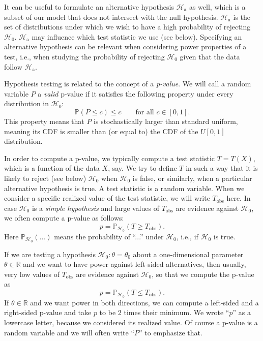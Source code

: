 \documentclass[11pt]{article}
\theoremstyle{plain}
\theoremstyle{definition}
\newcommand{\reals}{\mathbb{R}}
\newcommand{\Hy}{\mathcal{H}}
\newcommand{\pr}{\mathbb{P}}
\begin{document}
It can be useful to formulate an alternative hypothesis $\Hy_{\text{a}}$ as well, which is a subset of our model that does not intersect with the null hypothesis. $\Hy_{\text{a}}$ is the set of distributions under which  we wish to have a high probability of rejecting $\Hy_0$. $\Hy_{\text{a}}$ may influence which test statistic we use (see below). Specifying an alternative hypothesis can be relevant  when considering power properties of a test, i.e., when  studying the probability of rejecting $\Hy_0$ given that the data follow $\Hy_{\text{a}}$.


Hypothesis testing is related to the concept of a \emph{p-value}.
We will call a random variable $P$ a \emph{valid} p-value if it satisfies the following property  under every distribution in $\Hy_0$:
\begin{equation} \label{eqlunif}
\pr(P\leq c)\leq c \qquad \text{for all }c\in[0,1].
\end{equation}
This property means that $P$  is stochastically larger than standard uniform, meaning its CDF is smaller than (or equal to) the CDF of the $U[0,1]$ distribution. 

In order to compute a p-value, we typically compute a test statistic $T=T(X)$, which is a function of the data $X$, say. 
We try  to define $T$ in such a way that it is likely to reject (see below) $\Hy_0$ when $\Hy_0$ is false, or similarly, when a particular alternative hypothesis is true.
 A test statistic is  a random variable. When we consider a specific realized value of the test statistic, we will write $T_{\text{obs}}$ here.  In case $\Hy_0$ is a \emph{simple hypothesis} and large values of $T_{\text{obs}}$ are evidence against $\Hy_0$, we often compute a p-value as follows:
$$p = \pr_{\Hy_0}(T\geq T_{\text{obs}}).$$
Here $\pr_{\Hy_0}(...)$ means the probability of ``...'' under $\Hy_0$, i.e., if $\Hy_0$ is true.

If we are testing a hypothesis $\Hy_0:\theta=\theta_0$ about a one-dimensional parameter $\theta\in \reals$ and we want to have power against left-sided alternatives, then usually, very low values of $T_{\text{obs}}$ are evidence against $\Hy_0$, so that we compute the p-value as
$$p = \pr_{\Hy_0}(T\leq T_{\text{obs}}).$$ If $\theta\in \reals$ and we want power in both directions, we can compute a left-sided and a right-sided p-value and take $p$ to be 2 times their minimum.
We wrote ``$p$'' as a  lowercase letter, because we considered its realized value. Of course a p-value is a random variable and we will often write ``$P$'' to emphasize that. 
\end{document}
